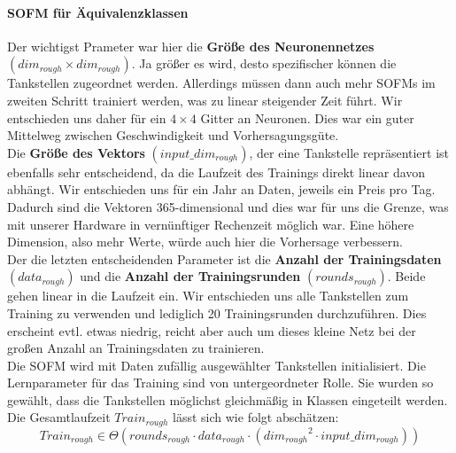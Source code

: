 \documentclass[11pt]{article}
\begin{document}
	\paragraph{SOFM für Äquivalenzklassen\\}
	Der wichtigst Prameter war hier die \textbf{Größe des Neuronennetzes} $(dim_{rough} \times dim_{rough})$. Ja größer es wird, desto spezifischer können die Tankstellen zugeordnet werden. Allerdings müssen dann auch mehr SOFMs im zweiten Schritt trainiert werden, was zu linear steigender Zeit führt. Wir entschieden uns daher für ein $4 \times 4$ Gitter an Neuronen. Dies war ein guter Mittelweg zwischen Geschwindigkeit und Vorhersagungsgüte.\\
	Die \textbf{Größe des Vektors} $(input\_dim_{rough})$, der eine Tankstelle repräsentiert ist ebenfalls sehr entscheidend, da die Laufzeit des Trainings direkt linear davon abhängt. Wir entschieden uns für ein Jahr an Daten, jeweils ein Preis pro Tag. Dadurch sind die Vektoren 365-dimensional und dies war für uns die Grenze, was mit unserer Hardware in vernünftiger Rechenzeit möglich war. Eine höhere Dimension, also mehr Werte, würde auch hier die Vorhersage verbessern.\\
	Der die letzten entscheidenden Parameter ist die \textbf{Anzahl der Trainingsdaten} $(data_{rough})$ und die \textbf{Anzahl der Trainingsrunden} $(rounds_{rough})$. Beide gehen linear in die Laufzeit ein. Wir entschieden uns alle Tankstellen zum Training zu verwenden und lediglich 20 Trainingsrunden durchzuführen. Dies erscheint evtl. etwas niedrig, reicht aber auch um dieses kleine Netz bei der großen Anzahl an Trainingsdaten zu trainieren.\\
	Die SOFM wird mit Daten zufällig ausgewählter Tankstellen initialisiert. Die Lernparameter für das Training sind von untergeordneter Rolle. Sie wurden so gewählt, dass die Tankstellen möglichst gleichmäßig in Klassen eingeteilt werden.\\
	Die Gesamtlaufzeit $Train_{rough}$ lässt sich wie folgt abschätzen:
	\[ Train_{rough} \in \Theta \left( rounds_{rough} \cdot data_{rough} \cdot \left( {dim_{rough}}^2 \cdot input\_dim_{rough} \right) \right) \]
	
\end{document}
